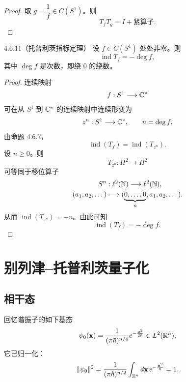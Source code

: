 
\begin{proof}
取 $g=\dfrac{1}{f}\in C(S^1)$。则
\[
T_fT_g=I+\text{紧算子}.
\]
\end{proof}

\begin{theorem}{4.6.11（托普利茨指标定理）}
  设 $f\in C(S^1)$ 处处非零。则
  \[
  \operatorname{ind}T_f=-\deg f,
  \]
  其中 $\deg f$ 是次数，即绕 $0$ 的绕数。
\end{theorem}

\begin{proof}
连续映射
\[
f:S^1\longrightarrow\mathbb{C}^*
\]
可在从 $S^1$ 到 $\mathbb{C}^*$ 的连续映射中连续形变为
\[
z^n:S^1\longrightarrow\mathbb{C}^*,\qquad n=\deg f.
\]
由命题 4.6.7，
\[
\operatorname{ind}(T_f)=\operatorname{ind}(T_{z^n}).
\]
设 $n\ge0$。则
\[
T_{z^n}:H^2\longrightarrow H^2
\]
可等同于移位算子
\begin{align*}
S^n&:\ell^2(\mathbb{N})\longrightarrow\ell^2(\mathbb{N}),\\
(a_1,a_2,\dots)&\longmapsto(\underbrace{0,\dots,0}_{n},a_1,a_2,\dots).
\end{align*}
从而 $\operatorname{ind}(T_{z^n})=-n$。由此可知
\[
\operatorname{ind}(T_f)=-\deg f.
\]
\end{proof}


\section{别列津–托普利茨量子化}

\subsection{相干态}

回忆谐振子的如下基态
\[
\psi_0(\mathbf x)=\frac{1}{(\pi\hbar)^{n/4}}e^{-\frac{\mathbf x^2}{2\hbar}}\in L^2(\mathbb{R}^n),
\]
它已归一化：
\[
\lVert \psi_0\rVert^2=\frac{1}{(\pi\hbar)^{n/2}}\int_{\mathbb{R}^n}d\mathbf x\,e^{-\frac{\mathbf x^2}{\hbar}}=1.
\]

